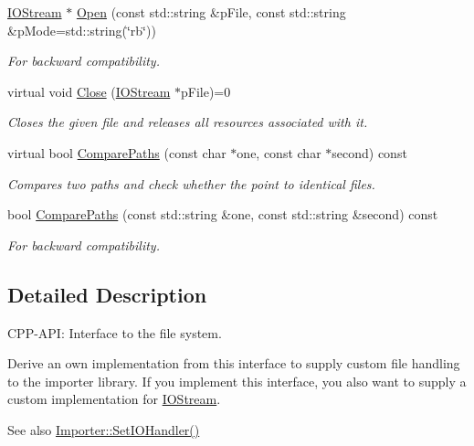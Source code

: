 \begin{DoxyCompactItemize}
\hyperlink{class_assimp_1_1_i_o_stream}{I\+O\+Stream} $\ast$ \hyperlink{class_assimp_1_1_i_o_system_aef35fabc9bd49fb83bfd4f12a94083c3}{Open} (const std\+::string \&p\+File, const std\+::string \&p\+Mode=std\+::string(\char`\"{}rb\char`\"{}))
\begin{DoxyCompactList}\small\item\em For backward compatibility. \end{DoxyCompactList}\item 
virtual void \hyperlink{class_assimp_1_1_i_o_system_a8c334d60f04bceeb6bd0157d21723f3e}{Close} (\hyperlink{class_assimp_1_1_i_o_stream}{I\+O\+Stream} $\ast$p\+File)=0
\begin{DoxyCompactList}\small\item\em Closes the given file and releases all resources associated with it. \end{DoxyCompactList}\item 
virtual bool \hyperlink{class_assimp_1_1_i_o_system_a11349a65b353ed62f655c3dd802b9062}{Compare\+Paths} (const char $\ast$one, const char $\ast$second) const 
\begin{DoxyCompactList}\small\item\em Compares two paths and check whether the point to identical files. \end{DoxyCompactList}\item 
bool \hyperlink{class_assimp_1_1_i_o_system_a279d1d4b0b2aa37800e222aad508dff1}{Compare\+Paths} (const std\+::string \&one, const std\+::string \&second) const 
\begin{DoxyCompactList}\small\item\em For backward compatibility. \end{DoxyCompactList}\end{DoxyCompactItemize}


\subsection{Detailed Description}
C\+P\+P-\/\+A\+PI\+: Interface to the file system. 

Derive an own implementation from this interface to supply custom file handling to the importer library. If you implement this interface, you also want to supply a custom implementation for \hyperlink{class_assimp_1_1_i_o_stream}{I\+O\+Stream}.

\begin{DoxySeeAlso}{See also}
\hyperlink{class_assimp_1_1_importer_a1161f46318af18bb86dfe0fc3edea4df}{Importer\+::\+Set\+I\+O\+Handler()} 
\end{DoxySeeAlso}


